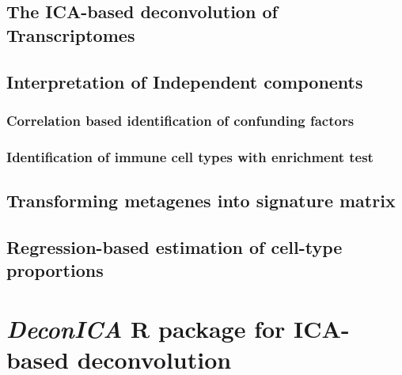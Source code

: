 \documentclass[12pt,]{book}
\theoremstyle{definition}
\theoremstyle{definition}
\theoremstyle{definition}
\theoremstyle{remark}
\begin{document}
\hypertarget{the-ica-based-deconvolution-of-transcriptomes}{%
\subsection{The ICA-based deconvolution of
Transcriptomes}\label{the-ica-based-deconvolution-of-transcriptomes}}

\hypertarget{interpretation-of-independent-components}{%
\subsection{Interpretation of Independent
components}\label{interpretation-of-independent-components}}

\hypertarget{correlation-based-identification-of-confunding-factors}{%
\subsubsection{Correlation based identification of confunding
factors}\label{correlation-based-identification-of-confunding-factors}}

\hypertarget{identification-of-immune-cell-types-with-enrichment-test}{%
\subsubsection{Identification of immune cell types with enrichment
test}\label{identification-of-immune-cell-types-with-enrichment-test}}

\hypertarget{transforming-metagenes-into-signature-matrix}{%
\subsection{Transforming metagenes into signature
matrix}\label{transforming-metagenes-into-signature-matrix}}

\hypertarget{regression-based-estimation-of-cell-type-proportions}{%
\subsection{Regression-based estimation of cell-type
proportions}\label{regression-based-estimation-of-cell-type-proportions}}

\hypertarget{deconica-r-package-for-ica-based-deconvolution}{%
\section{\texorpdfstring{\emph{DeconICA} R package for ICA-based
deconvolution}{DeconICA R package for ICA-based deconvolution}}\label{deconica-r-package-for-ica-based-deconvolution}}
\end{document}
